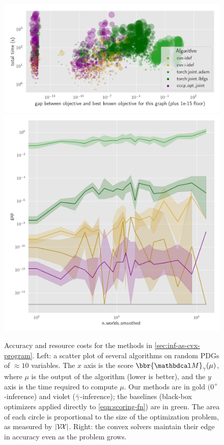 \begin{figure}
    \centering
    \includegraphics[width=0.67\linewidth]{figs/rand-joint/joint-gap-vs-time}%
    \includegraphics[width=0.32\linewidth]{figs/rand-joint/gap-vs-probsize-nolegend-big}
    \caption{
        Accuracy and resource costs for the methods in \cref{sec:inf-as-cvx-program}.  
        Left: a scatter plot of several algorithms on random PDGs of $\approx 10$ variables. The $x$ axis is the score $\bbr{\dg M}_\gamma(\mu)$, where $\mu$ is the output of the algorithm (lower is better), and the $y$ axis is the time required to compute $\mu$. 
        Our methods are in gold $(0^+$-inference) and violet (${\bar\gamma}$-inference); the baselines (black-box optimizers applied directly to \eqref{eqn:scoring-fn}) are in green.
        The area of each circle is proportional to the size of the optimization problem, as measured by
        $|\mathcal V\!\mathcal X|$.
        Right: the convex solvers maintain their edge in accuracy even as the problem grows.
     }\label{fig:joint-gap-time}
\end{figure}


